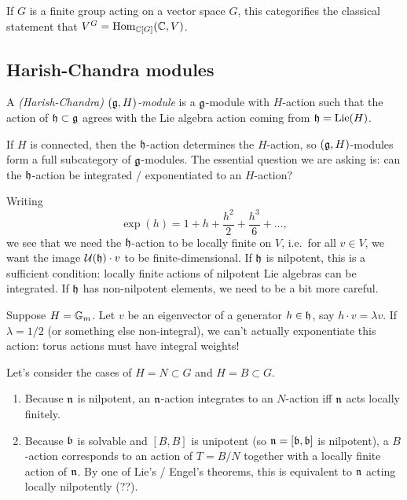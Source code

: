 \documentclass{article}
\begin{document}
\begin{ex}
	If $G$ is a finite group acting on a vector space $G$, this categorifies the classical statement that $V^G = \operatorname{Hom}_{\mathbb{C}[G]}(\mathbb{C}, V)$.
\end{ex}

\subsection{Harish-Chandra modules}

\begin{dfn}
	A \emph{(Harish-Chandra) $(\mathfrak{g}, H)$-module} is a $\mathfrak{g}$-module with $H$-action such that the action of $\mathfrak{h} \subset \mathfrak{g}$ agrees with the Lie algebra action coming from $\mathfrak{h} = \operatorname{Lie}(H)$.
\end{dfn}

If $H$ is connected, then the $\mathfrak{h}$-action determines the $H$-action, so $(\mathfrak{g}, H)$-modules form a full subcategory of $\mathfrak{g}$-modules.
The essential question we are asking is: can the $\mathfrak{h}$-action be integrated / exponentiated to an $H$-action?

Writing
\[
	\exp(h) = 1 + h + \frac{h^2}{2} + \frac{h^3}{6} + \dots,
\]
we see that we need the $\mathfrak{h}$-action to be locally finite on $V$, i.e.\ for all $v \in V$, we want the image $\mathcal{U}(\mathfrak{h}) \cdot v$ to be finite-dimensional.
If $\mathfrak{h}$ is nilpotent, this is a sufficient condition: locally finite actions of nilpotent Lie algebras can be integrated.
If $\mathfrak{h}$ has non-nilpotent elements, we need to be a bit more careful.

\begin{ex}
	Suppose $H = \mathbb{G}_m$.
	Let $v$ be an eigenvector of a generator $h \in \mathfrak{h}$, say $h \cdot v = \lambda v$.
	If $\lambda = 1/2$ (or something else non-integral), we can't actually exponentiate this action: torus actions must have integral weights!
\end{ex}

Let's consider the cases of $H = N \subset G$ and $H = B \subset G$.
\begin{enumerate}
	\item Because $\mathfrak{n}$ is nilpotent, an $\mathfrak{n}$-action integrates to an $N$-action iff $\mathfrak{n}$ acts locally finitely.
	\item Because $\mathfrak{b}$ is solvable and $[B, B]$ is unipotent (so $\mathfrak{n} = [\mathfrak{b}, \mathfrak{b}]$ is nilpotent), a $B$-action corresponds to an action of $T = B / N$ together with a locally finite action of $\mathfrak{n}$.
		By one of Lie's / Engel's theorems, this is equivalent to $\mathfrak{n}$ acting locally nilpotently (??).
\end{enumerate}
\end{document}
